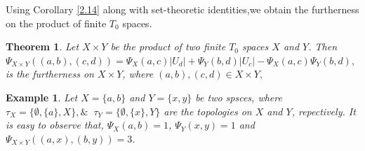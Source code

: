 \documentclass[12pt]{amsart}
\newtheorem{example}[definition]{Example}
\newtheorem{theorem}[definition]{Theorem}
\begin{document}
Using Corollary \ref{2.14} along with set-theoretic identities,we obtain the furtherness on the product of finite $T_0$ spaces.

\begin{theorem}\label{4.1}
	Let $X\times Y$ be the product of two finite $T_0$ spaces $X$ and $Y$. Then $\Psi_{X\times Y}((a,b),(c,d))=\Psi_{X}(a,c)|U_d|+\Psi_{Y}(b,d)|U_c|-\Psi_{X}(a,c)\Psi_{Y}(b,d),$ is the furtherness on $X\times Y$, where  $(a,b),(c,d)\in X\times Y,$ 
\end{theorem}


\begin{example}
Let $X=\{a,b\}$ and $Y=\{x,y\}$ be two spsces, where $\tau_X=\{\emptyset,\{a\},X\}, \&~$ $\tau_Y=\{\emptyset,\{x\},Y\}$ are the topologies on $X$ and $Y$, repectively. It is easy to observe that, $\Psi_X(a,b)=1$, $\Psi_Y(x,y)=1$ and $\Psi_{X\times Y}((a,x),(b,y))=3$.
\end{example}

\end{document}
